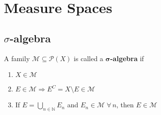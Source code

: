 \newpage
\section{Measure Spaces}
\subsection{\texorpdfstring{\(\sigma\)}{sigma}-algebra}
\begin{definition}
    A family \(\mathcal{M} \subseteq \mathcal{P}(X)\) is called a \textbf{\(\mathbf{\sigma}\)-algebra} if 
    \begin{enumerate}
        \item \(X \in \mathcal{M}\)
        \item \(E \in \mathcal{M} \Rightarrow E^C = X\setminus E \in \mathcal{M}\)
        \item If \(E = \bigcup_{n \in \mathbb{N}}E_n\) and \(E_n \in \mathcal{M} \; \forall \, n\), then \(E \in \mathcal{M}\)
    \end{enumerate}
\end{definition}
